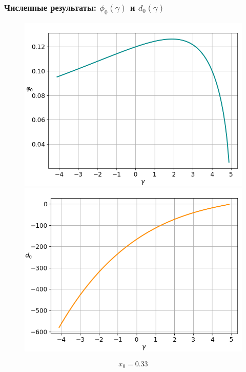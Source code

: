 \documentclass[fullscreen=true, unicode, bookmarks=false]{beamer}
\begin{document}
\begin{frame}
\frametitle{ Численные результаты: $ \phi_0(\gamma) $ и $ d_0(\gamma) $ }

\begin{figure} 
\includegraphics[scale=0.35]{oscillating_phi0_0,33.png}  
\hfill
\includegraphics[scale=0.35]{oscillating_d0_0,33.png}  
\end{figure}

$$ x_0 = 0.33 $$

\end{frame}
\end{document}
